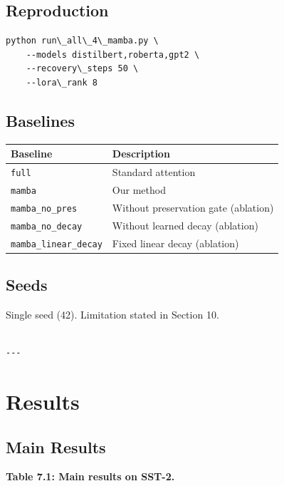\subsection{Reproduction}

\begin{lstlisting}
python run\_all\_4\_mamba.py \
    --models distilbert,roberta,gpt2 \
    --recovery\_steps 50 \
    --lora\_rank 8
\end{lstlisting}

\subsection{Baselines}

\begin{table}[H]
\centering
\small
\begin{tabular}{ll}
\toprule
\textbf{Baseline} & \textbf{Description} \\
\midrule
\texttt{full} & Standard attention \\
\texttt{mamba} & Our method \\
\texttt{mamba\_no\_pres} & Without preservation gate (ablation) \\
\texttt{mamba\_no\_decay} & Without learned decay (ablation) \\
\texttt{mamba\_linear\_decay} & Fixed linear decay (ablation) \\
\bottomrule
\end{tabular}
\end{table}

\subsection{Seeds}

Single seed (42). Limitation stated in Section 10.
\begin{lstlisting}

---
\end{lstlisting}

\section{Results}

\subsection{Main Results}

\textbf{Table 7.1: Main results on SST-2.}

